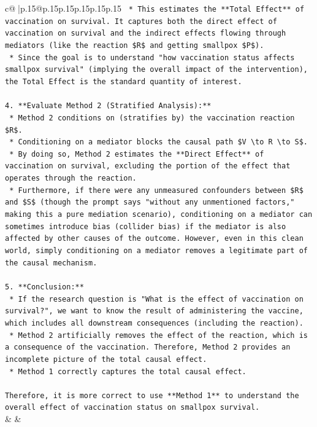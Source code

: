 \documentclass{article}
\begin{document}
{\begin{supertabular}{c@{$\;$}|p{.15\linewidth}@{}p{.15\linewidth}p{.15\linewidth}p{.15\linewidth}p{.15\linewidth}p{.15\linewidth}}
{{{\texttt{    *   This estimates the **Total Effect** of vaccination on survival. It captures both the direct effect of vaccination on survival and the indirect effects flowing through mediators (like the reaction \$R\$ and getting smallpox \$P\$).} \\
\texttt{    *   Since the goal is to understand "how vaccination status affects smallpox survival" (implying the overall impact of the intervention), the Total Effect is the standard quantity of interest.} \\
\\ 
\texttt{4.  **Evaluate Method 2 (Stratified Analysis):**} \\
\texttt{    *   Method 2 conditions on (stratifies by) the vaccination reaction \$R\$.} \\
\texttt{    *   Conditioning on a mediator blocks the causal path \$V \textbackslash{}to R \textbackslash{}to S\$.} \\
\texttt{    *   By doing so, Method 2 estimates the **Direct Effect** of vaccination on survival, excluding the portion of the effect that operates through the reaction.} \\
\texttt{    *   Furthermore, if there were any unmeasured confounders between \$R\$ and \$S\$ (though the prompt says "without any unmentioned factors," making this a pure mediation scenario), conditioning on a mediator can sometimes introduce bias (collider bias) if the mediator is also affected by other causes of the outcome. However, even in this clean world, simply conditioning on a mediator removes a legitimate part of the causal mechanism.} \\
\\ 
\texttt{5.  **Conclusion:**} \\
\texttt{    *   If the research question is "What is the effect of vaccination on survival?", we want to know the result of administering the vaccine, which includes all downstream consequences (including the reaction).} \\
\texttt{    *   Method 2 artificially removes the effect of the reaction, which is a consequence of the vaccination. Therefore, Method 2 provides an incomplete picture of the total causal effect.} \\
\texttt{    *   Method 1 correctly captures the total causal effect.} \\
\\ 
\texttt{Therefore, it is more correct to use **Method 1** to understand the overall effect of vaccination status on smallpox survival.} \\
            }
        }
    }
    & & \\ \\


\end{supertabular}}
\end{document}
